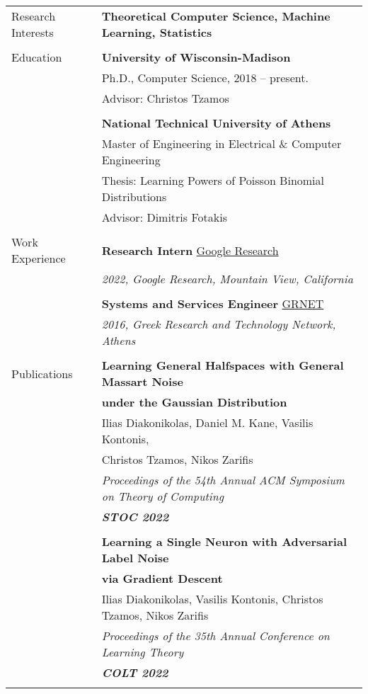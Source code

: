 \documentclass[letterpaper,11pt,oneside]{article}
\begin{document}
\noindent \begin{longtable}{@{} l l}
\Large{Research Interests} & \textbf{Theoretical Computer Science, Machine Learning, Statistics}
\\
&\\
 \Large{Education}

     & \textbf{University of Wisconsin-Madison} \\
     & Ph.D., Computer Science, 2018 -- present. \\
     & Advisor: Christos Tzamos\\
     & \\

     & \textbf{National Technical University of Athens} \\
     & Master of Engineering in Electrical \& Computer Engineering\\
     & Thesis: Learning Powers of Poisson Binomial Distributions\\
     & Advisor: Dimitris Fotakis \\
     & \\

\Large{Work Experience}
  &\textbf{Research Intern} \href{https://research.google}{Google Research}\\
  & \emph{2022, Google Research, Mountain View, California}\\
  &\\
  
  &\textbf{Systems and Services Engineer} \href{https://grnet.gr/}{GRNET}\\
  & \emph{2016, Greek Research and Technology Network, Athens}\\
  &\\

 \Large{Publications}

 &\textbf{Learning General Halfspaces with General Massart Noise}\\
 & \textbf{under the Gaussian Distribution}\\
 & Ilias Diakonikolas, Daniel M. Kane, Vasilis Kontonis,\\
 & Christos Tzamos, Nikos Zarifis \\
 & \emph{Proceedings of the 54th Annual ACM Symposium on Theory of Computing}\\
 & \emph{\textbf{STOC 2022}} \\
 & \\


 &\textbf{Learning a Single Neuron with Adversarial Label Noise}\\
 & \textbf{via Gradient Descent}\\
 & Ilias Diakonikolas, Vasilis Kontonis, Christos Tzamos, Nikos Zarifis \\
 & \emph{Proceedings of the 35th Annual Conference on Learning Theory}\\
 & \emph{\textbf{COLT 2022}} \\
 & \\



\end{longtable}
\end{document}
